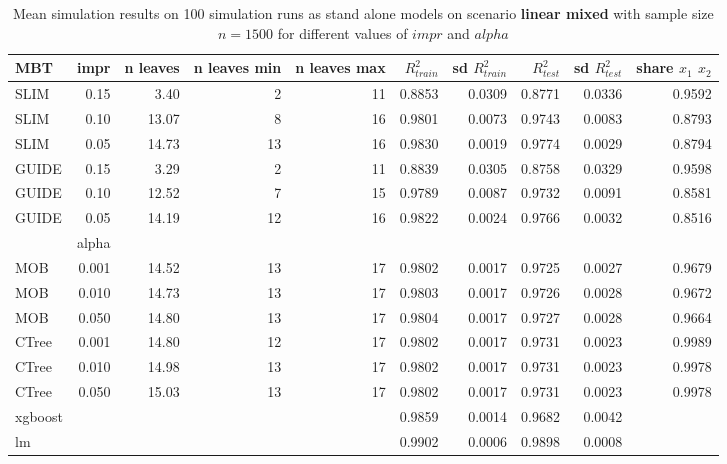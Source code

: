 \begin{table}[!htb]
\centering \tiny
\begin{tabular}[t]{l|r|r|r|r|r|r|r|r|r}
\hline

MBT & impr  & n leaves & n leaves min & n leaves max & $R^2_{train}$ & sd $R^2_{train}$ & $R^2_{test}$ & sd $R^2_{test}$ & share $x_1$ $x_2$\\
\hline

SLIM & 0.15 & 3.40 & 2 & 11 & 0.8853 & 0.0309 & 0.8771 & 0.0336 & 0.9592\\
SLIM & 0.10 & 13.07 & 8 & 16 & 0.9801 & 0.0073 & 0.9743 & 0.0083 & 0.8793\\
SLIM & 0.05 & 14.73 & 13 & 16 & 0.9830 & 0.0019 & 0.9774 & 0.0029 & 0.8794\\
GUIDE & 0.15 & 3.29 & 2 & 11 & 0.8839 & 0.0305 & 0.8758 & 0.0329 & 0.9598\\
GUIDE & 0.10 & 12.52 & 7 & 15 & 0.9789 & 0.0087 & 0.9732 & 0.0091 & 0.8581\\
GUIDE & 0.05 & 14.19 & 12 & 16 & 0.9822 & 0.0024 & 0.9766 & 0.0032 & 0.8516\\

\hline

& alpha & & & & & & & \\
\hline

MOB & 0.001 & 14.52 & 13 & 17 & 0.9802 & 0.0017 & 0.9725 & 0.0027 & 0.9679\\
MOB & 0.010 & 14.73 & 13 & 17 & 0.9803 & 0.0017 & 0.9726 & 0.0028 & 0.9672\\
MOB & 0.050 & 14.80 & 13 & 17 & 0.9804 & 0.0017 & 0.9727 & 0.0028 & 0.9664\\

CTree & 0.001 & 14.80 & 12 & 17 & 0.9802 & 0.0017 & 0.9731 & 0.0023 & 0.9989\\
CTree & 0.010 & 14.98 & 13 & 17 & 0.9802 & 0.0017 & 0.9731 & 0.0023 & 0.9978\\
CTree & 0.050 & 15.03 & 13 & 17 & 0.9802 & 0.0017 & 0.9731 & 0.0023 & 0.9978\\
\hline

xgboost & & & & & 0.9859 & 0.0014 & 0.9682 & 0.0042 &\\
lm & & & & & 0.9902 & 0.0006 & 0.9898 & 0.0008 &\\
\hline

\end{tabular}
\caption{Mean simulation results on 100 simulation runs as stand alone models on scenario \textbf{linear mixed} with sample size $n = 1500$ for different values of $impr$ and $alpha$}
\label{tab:linear_mixed_summary}
\end{table}

